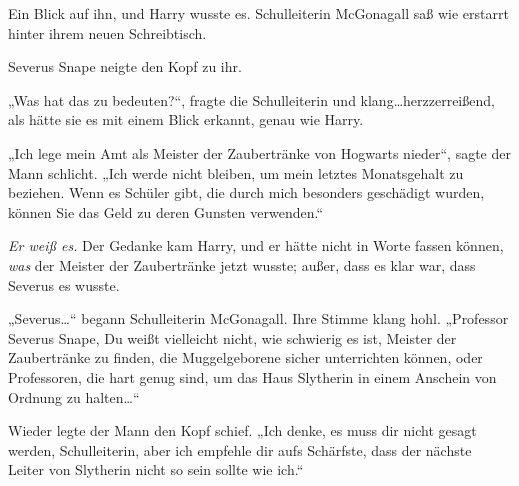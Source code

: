 Ein Blick auf ihn, und Harry wusste es. Schulleiterin McGonagall saß wie erstarrt hinter ihrem neuen Schreibtisch.

Severus Snape neigte den Kopf zu ihr.

„Was hat das zu bedeuten?“, fragte die Schulleiterin und klang…herzzerreißend, als hätte sie es mit einem Blick erkannt, genau wie Harry.

„Ich lege mein Amt als Meister der Zaubertränke von Hogwarts nieder“, sagte der Mann schlicht. „Ich werde nicht bleiben, um mein letztes Monatsgehalt zu beziehen. Wenn es Schüler gibt, die durch mich besonders geschädigt wurden, können Sie das Geld zu deren Gunsten verwenden.“

\emph{Er weiß es.}
Der Gedanke kam Harry, und er hätte nicht in Worte fassen können, \emph{was} der Meister der Zaubertränke jetzt wusste; außer, dass es klar war, dass Severus es wusste.

„Severus…“ begann Schulleiterin McGonagall. Ihre Stimme klang hohl. „Professor Severus Snape, Du weißt vielleicht nicht, wie schwierig es ist, Meister der Zaubertränke zu finden, die Muggelgeborene sicher unterrichten können, oder Professoren, die hart genug sind, um das Haus Slytherin in einem Anschein von Ordnung zu halten…“

Wieder legte der Mann den Kopf schief.
„Ich denke, es muss dir nicht gesagt werden, Schulleiterin, aber ich empfehle dir aufs Schärfste, dass der nächste Leiter von Slytherin nicht so sein sollte wie ich.“

